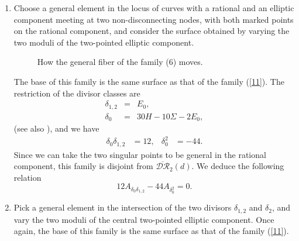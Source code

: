 \documentclass[10pt]{amsart}
\theoremstyle{definition}
\begin{document}
{\begin{enumerate}
The divisor classes of ${\overline{\mathcal{M}}}_{2,2}$ restrict as follows
\begin{eqnarray*}
\psi_1 &=& 3H-\Sigma+E_0,\\
\delta_{1,1} &=& {}-3H+\Sigma-E_0,\\
\delta_{1,2} &=& E_0,\\
\delta_0 &=& 36H-12\Sigma,
\end{eqnarray*}
and we obtain
\begin{align*}
\psi_1^2 &= 1, & \psi_1\delta_{1,1} &=-1, & \psi_1\delta_0 = \delta_0\delta_{1,2} &=12, & \delta_0\delta_{1,1} &= -12.
\end{align*}
Since the second marked point is general, the surface is disjoint from the locus $\overline{\mathcal{DR}}_2(d)$, hence we deduce the following relation
\[
 A_{\psi_1^2+\psi_2^2} - A_{\psi_1\delta_{1,1}} +12A_{\psi_1\delta_0}-12A_{\delta_0\delta_{1,1}}+12A_{\delta_0\delta_{1,2}}=0.
\]

\item Choose a general element in 
the locus of curves with a rational and an elliptic component meeting at two non-disconnecting nodes, with both marked points on the rational component, 
and consider the surface obtained by varying the two moduli of the two-pointed elliptic component.

\begin{figure}[htbp]
\centering
  
  

  \caption{How the general fiber of the family (6) moves.}
\end{figure}

The base of this family is the same surface as that of the family (\ref{11}). The restriction of the divisor classes are
\begin{eqnarray*}
 \delta_{1,2} &=& E_0,\\
\delta_0 &=& 30 H-10\Sigma-2E_0,
\end{eqnarray*}
(see also \cite[\S 2 (9)]{MR1023390}), and we have
\begin{align*}
\delta_0\delta_{1,2} &=12,  & \delta_0^2 &= -44.
\end{align*}
Since we can take the two singular points to be general in the rational component, this family is disjoint from $\overline{\mathcal{DR}}_2(d)$. We deduce the following relation
\[
 12A_{\delta_0\delta_{1,2}} -44 A_{\delta_0^2}=0.
\]

\item \label{8} Pick a general element in the 
intersection of the two divisors $\delta_{1,2}$ and $\delta_2$, 
and vary the two moduli of the central two-pointed elliptic component.
 Once again, the base of this family is the same surface as that of the family (\ref{11}).
 

\end{enumerate}}
\end{document}
